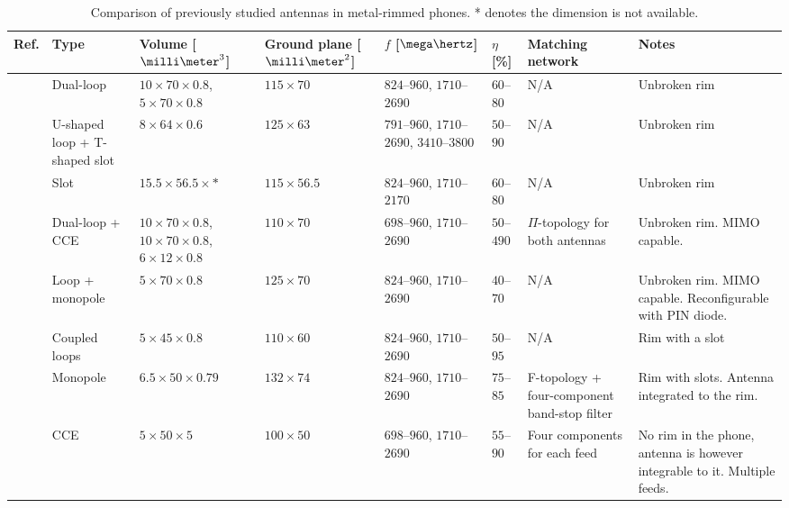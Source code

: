 \begin{table}
\centering
\vspace*{1cm}
\caption{Comparison of previously studied antennas in metal-rimmed phones. * denotes the dimension is not available.}
\label{tab:metal_rim_comp}
\begin{tabular}{|M{0.03\textheight}|M{0.11\textheight}|M{0.11\textheight}|M{0.11\textheight}|M{0.1\textheight}|M{0.06\textheight}|M{0.15\textheight}|>{\Centering\hspace*{0pt}}M{0.18\textheight}|}
    \hline
    \textbf{Ref.} & \textbf{Type} & \textbf{Volume [$\milli\meter^3$]} & \textbf{Ground plane [$\milli\meter^2$]} &\textbf{$f$ [$\mega\hertz$]} & \textbf{$\eta$ [\%]} & \textbf{Matching network} & \textbf{Notes}\\
    \hline
    \cite{ban_dual_loop} & Dual-loop & $10\times70\times0.8$, $5\times70\times0.8$ & $115\times70$ & $824$--$960$, $1710$--$2690$ & $60$--$80$ & N/A & Unbroken rim\\
    \hline
    \cite{hsu_compact} & U-shaped loop + T-shaped slot & $8\times64\times0.6$ & $125\times63$ & $791$--$960$, $1710$--$2690$, $3410$--$3800$ & $50$--$90$ & N/A & Unbroken rim\\
    \hline
    \cite{yuan_slot} & Slot & $15.5\times56.5\times*$ & $115\times56.5$ & $824$--$960$, $1710$--$2170$ & $60$--$80$ & N/A & Unbroken rim\\
    \hline
    \cite{stanley_lte_mimo} & Dual-loop + CCE & $10\times70\times0.8$, $10\times70\times0.8$, $6\times12\times0.8$ & $110\times70$ & $698$--$960$, $1710$--$2690$ & $50$--$490$ & $\Pi$-topology for both antennas & Unbroken rim. MIMO capable.\\
    \hline
    \cite{reconf_narrow} & Loop + monopole & $5\times70\times0.8$ & $125\times70$ & $824$--$960$, $1710$--$2690$ & $40$--$70$ & N/A & Unbroken rim. MIMO capable. Re\-con\-fi\-gu\-rable with PIN diode.\\
    \hline
    \cite{hybrid} & Coupled loops & $5\times45\times0.8$ & $110\times60$ & $824$--$960$, $1710$--$2690$ & $50$--$95$ & N/A & Rim with a slot\\
    \hline
    \cite{lee_monopole} & Monopole & $6.5\times50\times0.79$ & $132\times74$ & $824$--$960$, $1710$--$2690$ & $75$--$85$ & F-topology + four-component band-stop filter & Rim with slots. Antenna integrated to the rim.\\
    \hline
    \cite{valkonen_multifeed} & CCE & $5\times50\times5$ & $100\times50$ & $698$--$960$, $1710$--$2690$ & $55$--$90$ & Four components for each feed & No rim in the phone, antenna is however integrable to it. Multiple feeds.\\

\end{tabular}
\end{table}
